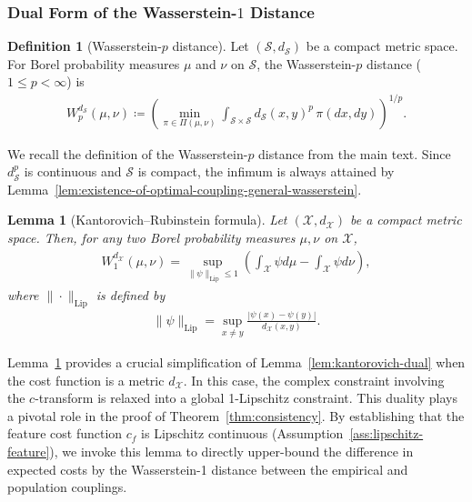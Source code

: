 \documentclass{article}
\theoremstyle{plain}
\newtheorem{lemma}[theorem]{Lemma}
\theoremstyle{definition}
\newtheorem{definition}[theorem]{Definition}
\theoremstyle{remark}
\begin{document}
\subsubsection{Dual Form of the Wasserstein-$1$ Distance}
\begin{definition}[Wasserstein-$p$ distance]
	Let $(\mathcal{S},d_{\mathcal{S}})$ be a compact metric space. For Borel probability measures $\mu$ and $\nu$ on $\mathcal{S}$, the Wasserstein-$p$ distance ($1 \leq p < \infty$) is
	\begin{align*}
		W_p^{d_{\mathcal{S}}}(\mu,\nu) \coloneqq \left(\min_{\pi \in \Pi(\mu,\nu)} \int_{\mathcal{S} \times \mathcal{S}} d_{\mathcal{S}}(x,y)^p \, \pi(dx,dy)\right)^{1/p}.
	\end{align*}
\end{definition}
We recall the definition of the Wasserstein-$p$ distance from the main text. Since $d_{\mathcal{S}}^p$ is continuous and $\mathcal{S}$ is compact, the infimum is always attained by Lemma~\ref{lem:existence-of-optimal-coupling-general-wasserstein}.

\begin{lemma}[Kantorovich--Rubinstein formula]
	\label{lem:kantorovic-rubinstein}
	Let $(\mathcal{X},d_{\mathcal{X}})$ be a compact metric space. Then, for any two Borel probability measures $\mu,\nu$ on $\mathcal{X}$,
	\begin{align*}
		W_1^{d_{\mathcal{X}}}(\mu,\nu) = \sup_{\|\psi\|_{\mathrm{Lip}} \leq 1} \left(\int_{\mathcal{X}} \psi d\mu - \int_{\mathcal{X}} \psi d\nu \right) ,
	\end{align*}
	where $\|\cdot\|_{\mathrm{Lip}}$ is defined by
	\begin{align*}
		\| \psi \|_{\mathrm{Lip}} = \sup_{x \neq y} \frac{| \psi(x) - \psi(y) |}{d_{\mathcal{X}}(x,y)} .
	\end{align*}
\end{lemma}
Lemma~\ref{lem:kantorovic-rubinstein} provides a crucial simplification of Lemma~\ref{lem:kantorovich-dual} when the cost function is a metric $d_{\mathcal{X}}$. In this case, the complex constraint involving the $c$-transform is relaxed into a global 1-Lipschitz constraint. This duality plays a pivotal role in the proof of Theorem~\ref{thm:consistency}. By establishing that the feature cost function $c_f$ is Lipschitz continuous (Assumption~\ref{ass:lipschitz-feature}), we invoke this lemma to directly upper-bound the difference in expected costs by the Wasserstein-1 distance between the empirical and population couplings.
\end{document}
